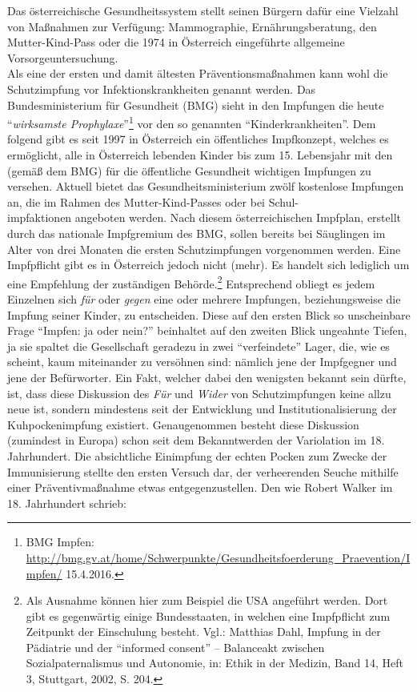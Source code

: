 \documentclass[
    a4paper,
    12pt,
    hyphens,
    chapterprefix=true,
    headheight=33pt,
    footheight=29pt,
    headings=optiontohead,
]{scrartcl}
\begin{document}
Das österreichische Gesundheitssystem stellt seinen Bürgern dafür eine Vielzahl von Maßnahmen zur Verfügung: Mammographie, Ernährungsberatung, den Mutter-Kind-Pass oder die 1974 in Österreich eingeführte allgemeine Vorsorgeuntersuchung.\\
Als eine der ersten und damit ältesten Präventionsmaßnahmen kann wohl die Schutzimpfung vor Infektionskrankheiten genannt werden. Das Bundesministerium für Gesundheit (BMG) sieht in den Impfungen die heute "`\textit{wirksamste Prophylaxe}"'\footnote{BMG Impfen: \url{http://bmg.gv.at/home/Schwerpunkte/Gesundheitsfoerderung\_Praevention/Impfen/} 15.4.2016.} vor den so genannten "`Kinderkrankheiten"'. Dem folgend gibt es seit 1997 in Österreich ein öffentliches Impfkonzept, welches es ermöglicht, alle in Österreich lebenden Kinder bis zum 15. Lebensjahr mit den (gemäß dem BMG) für die öffentliche Gesundheit wichtigen Impfungen zu versehen. Aktuell bietet das Gesundheitsministerium zwölf kostenlose Impfungen an, die im Rahmen des Mutter-Kind-Passes oder bei
Schul-\\impfaktionen angeboten werden. Nach diesem österreichischen Impfplan, erstellt durch das nationale Impfgremium des BMG, sollen bereits bei Säuglingen im Alter von drei Monaten die ersten Schutzimpfungen vorgenommen werden. Eine Impfpflicht gibt es in Österreich jedoch nicht (mehr). Es handelt sich lediglich um eine Empfehlung der zuständigen Behörde.\footnote{Als Ausnahme können hier zum Beispiel die USA angeführt werden. Dort gibt es gegenwärtig einige Bundesstaaten, in welchen eine Impfpflicht zum Zeitpunkt der Einschulung besteht. Vgl.: Matthias Dahl, Impfung in der Pädiatrie und der "`informed consent"' -- Balanceakt zwischen Sozialpaternalismus und Autonomie, in: Ethik in der Medizin, Band 14, Heft 3, Stuttgart, 2002, S. 204.} Entsprechend obliegt es jedem Einzelnen sich \textit{für} oder \textit{gegen} eine oder mehrere Impfungen, beziehungsweise die Impfung seiner Kinder, zu entscheiden. Diese auf den ersten Blick so unscheinbare Frage "`Impfen: ja oder nein?"' beinhaltet auf den zweiten Blick ungeahnte Tiefen, ja sie spaltet die Gesellschaft geradezu in zwei "`verfeindete"' Lager, die, wie es scheint, kaum miteinander zu versöhnen sind: nämlich jene der Impfgegner und jene der Befürworter. Ein Fakt, welcher dabei den wenigsten bekannt sein dürfte, ist, dass diese Diskussion des \textit{Für} und \textit{Wider} von Schutzimpfungen keine allzu neue ist, sondern mindestens seit der Entwicklung und Institutionalisierung der Kuhpockenimpfung existiert. Genaugenommen besteht diese Diskussion (zumindest in Europa) schon seit dem Bekanntwerden der Variolation im 18. Jahrhundert. Die absichtliche Einimpfung der echten Pocken zum Zwecke der Immunisierung stellte den ersten Versuch dar, der verheerenden Seuche mithilfe einer Präventivmaßnahme etwas entgegenzustellen. Den wie Robert Walker im 18. Jahrhundert schrieb: \\
\end{document}
